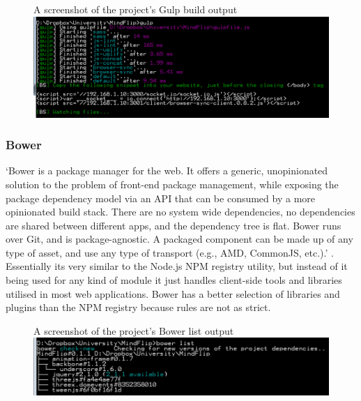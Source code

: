 \documentclass[final]{cmpreport}
\begin{document}
\begin{figure}[h!]{A screenshot of the project's Gulp build output}
  \includegraphics[width=1.0\textwidth]{gulp.png}
\end{figure}

\subsubsection{Bower}
`Bower is a package manager for the web. It offers a generic, unopinionated solution to the problem of front-end package management, while exposing the package dependency model via an API that can be consumed by a more opinionated build stack. There are no system wide dependencies, no dependencies are shared between different apps, and the dependency tree is flat. Bower runs over Git, and is package-agnostic. A packaged component can be made up of any type of asset, and use any type of transport (e.g., AMD, CommonJS, etc.).' \citep{Twitter}. Essentially its very similar to the Node.js NPM registry utility, but instead of it being used for any kind of module it just handles client-side tools and libraries utilised in most web applications. Bower has a better selection of libraries and plugins than the NPM registry because rules are not as strict.

\begin{figure}[h!]{A screenshot of the project's Bower list output}
  \includegraphics[width=1.0\textwidth]{bower.png}
\end{figure}
\end{document}
